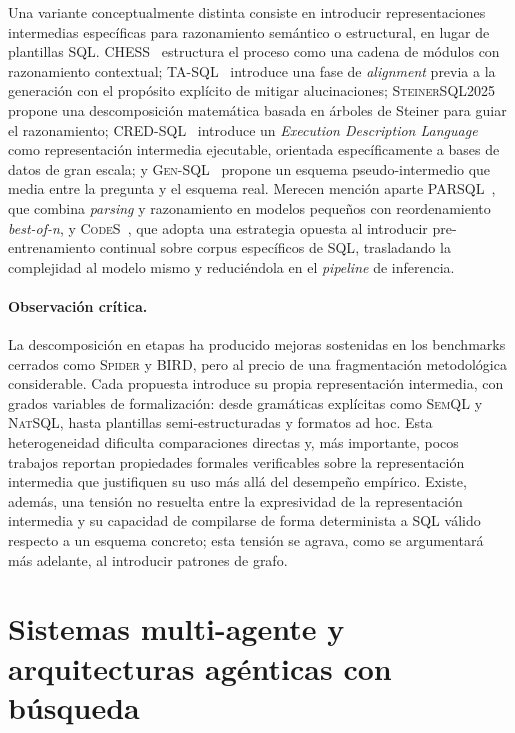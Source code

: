 Una variante conceptualmente distinta consiste en introducir representaciones
intermedias específicas para razonamiento semántico o estructural, en lugar
de plantillas \ac{SQL}. \textsc{CHESS}~\cite{CHESS2024} estructura el proceso
como una cadena de módulos con razonamiento contextual; \textsc{TA-SQL}~%
\cite{TA-SQL2024} introduce una fase de \emph{alignment} previa a la
generación con el propósito explícito de mitigar alucinaciones;
\textsc{SteinerSQL2025}~\cite{SteinerSQL2025} propone una descomposición
matemática basada en árboles de Steiner para guiar el razonamiento;
\textsc{CRED-SQL}~\cite{CRED-SQL2025} introduce un \emph{Execution Description
Language} como representación intermedia ejecutable, orientada específicamente
a bases de datos de gran escala; y \textsc{Gen-SQL}~\cite{Gen-SQL2025} propone
un esquema pseudo-intermedio que media entre la pregunta y el esquema real.
Merecen mención aparte \textsc{PARSQL}~\cite{PARSQL2025}, que combina
\emph{parsing} y razonamiento en modelos pequeños con reordenamiento
\emph{best-of-n}, y \textsc{CodeS}~\cite{CodeS2024}, que adopta una estrategia
opuesta al introducir pre-entrenamiento continual sobre corpus específicos de
\ac{SQL}, trasladando la complejidad al modelo mismo y reduciéndola en el
\emph{pipeline} de inferencia.

\paragraph{Observación crítica.} La descomposición en etapas ha producido
mejoras sostenidas en los benchmarks cerrados como \textsc{Spider} y
\textsc{BIRD}, pero al precio de una fragmentación metodológica considerable.
Cada propuesta introduce su propia representación intermedia, con grados
variables de formalización: desde gramáticas explícitas como \textsc{SemQL} y
\textsc{NatSQL}, hasta plantillas semi-estructuradas y formatos ad hoc. Esta
heterogeneidad dificulta comparaciones directas y, más importante, pocos
trabajos reportan propiedades formales verificables sobre la representación
intermedia que justifiquen su uso más allá del desempeño empírico. Existe,
además, una tensión no resuelta entre la expresividad de la representación
intermedia y su capacidad de compilarse de forma determinista a \ac{SQL}
válido respecto a un esquema concreto; esta tensión se agrava, como se
argumentará más adelante, al introducir patrones de grafo.

\section{Sistemas multi-agente y arquitecturas agénticas con búsqueda}
\label{sec:sota-multiagente}

